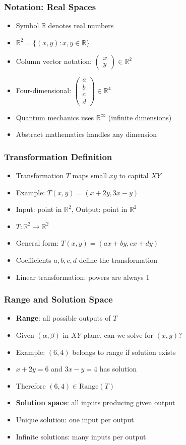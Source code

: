 \begin{frame}[fragile]\frametitle{Notation: Real Spaces}
  \begin{itemize}
    \item Symbol $\mathbb{R}$ denotes real numbers
    \item $\mathbb{R}^2 = \{(x,y) : x,y \in \mathbb{R}\}$
    \item Column vector notation: $\begin{pmatrix} x \\ y \end{pmatrix} \in \mathbb{R}^2$
    \item Four-dimensional: $\begin{pmatrix} a \\ b \\ c \\ d \end{pmatrix} \in \mathbb{R}^4$
    \item Quantum mechanics uses $\mathbb{R}^\infty$ (infinite dimensions)
    \item Abstract mathematics handles any dimension
  \end{itemize}
\end{frame}

\begin{frame}[fragile]\frametitle{Transformation Definition}
  \begin{itemize}
    \item Transformation $T$ maps small $xy$ to capital $XY$
    \item Example: $T(x, y) = (x + 2y, 3x - y)$
    \item Input: point in $\mathbb{R}^2$, Output: point in $\mathbb{R}^2$
    \item $T: \mathbb{R}^2 \to \mathbb{R}^2$
    \item General form: $T(x,y) = (ax + by, cx + dy)$
    \item Coefficients $a, b, c, d$ define the transformation
    \item Linear transformation: powers are always 1
  \end{itemize}
\end{frame}

\begin{frame}[fragile]\frametitle{Range and Solution Space}
  \begin{itemize}
    \item \textbf{Range}: all possible outputs of $T$
    \item Given $(\alpha, \beta)$ in $XY$ plane, can we solve for $(x,y)$?
    \item Example: $(6, 4)$ belongs to range if solution exists
    \item $x + 2y = 6$ and $3x - y = 4$ has solution
    \item Therefore $(6, 4) \in \text{Range}(T)$
    \item \textbf{Solution space}: all inputs producing given output
    \item Unique solution: one input per output
    \item Infinite solutions: many inputs per output
  \end{itemize}
\end{frame}

